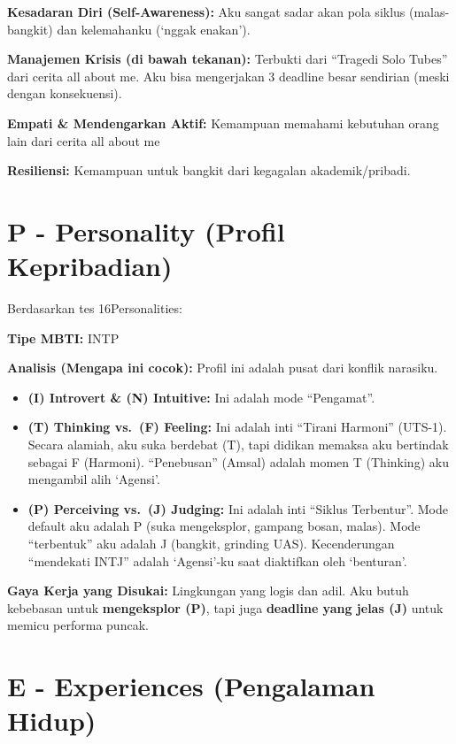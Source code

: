 \documentclass[
  letterpaper,
  DIV=11,
  numbers=noendperiod]{scrreprt}
\begin{document}
\textbf{Kesadaran Diri (Self-Awareness):} Aku sangat sadar akan pola
siklus (malas-bangkit) dan kelemahanku (`nggak enakan').

\textbf{Manajemen Krisis (di bawah tekanan):} Terbukti dari ``Tragedi
Solo Tubes'' dari cerita all about me. Aku bisa mengerjakan 3 deadline
besar sendirian (meski dengan konsekuensi).

\textbf{Empati \& Mendengarkan Aktif:} Kemampuan memahami kebutuhan
orang lain dari cerita all about me

\textbf{Resiliensi:} Kemampuan untuk bangkit dari kegagalan
akademik/pribadi.

\section{P - Personality (Profil
Kepribadian)}\label{p---personality-profil-kepribadian}

Berdasarkan tes 16Personalities:

\textbf{Tipe MBTI:} INTP

\textbf{Analisis (Mengapa ini cocok):} Profil ini adalah pusat dari
konflik narasiku.

\begin{itemize}
\item
  \textbf{(I) Introvert \& (N) Intuitive:} Ini adalah mode ``Pengamat''.
\item
  \textbf{(T) Thinking vs.~(F) Feeling:} Ini adalah inti ``Tirani
  Harmoni'' (UTS-1). Secara alamiah, aku suka berdebat (T), tapi didikan
  memaksa aku bertindak sebagai F (Harmoni). ``Penebusan'' (Amsal)
  adalah momen T (Thinking) aku mengambil alih `Agensi'.
\item
  \textbf{(P) Perceiving vs.~(J) Judging:} Ini adalah inti ``Siklus
  Terbentur''. Mode default aku adalah P (suka mengeksplor, gampang
  bosan, malas). Mode ``terbentuk'' aku adalah J (bangkit, grinding
  UAS). Kecenderungan ``mendekati INTJ'' adalah `Agensi'-ku saat
  diaktifkan oleh `benturan'.
\end{itemize}

\textbf{Gaya Kerja yang Disukai:} Lingkungan yang logis dan adil. Aku
butuh kebebasan untuk \textbf{mengeksplor (P)}, tapi juga
\textbf{deadline yang jelas (J)} untuk memicu performa puncak.

\section{E - Experiences (Pengalaman
Hidup)}\label{e---experiences-pengalaman-hidup}
\end{document}
